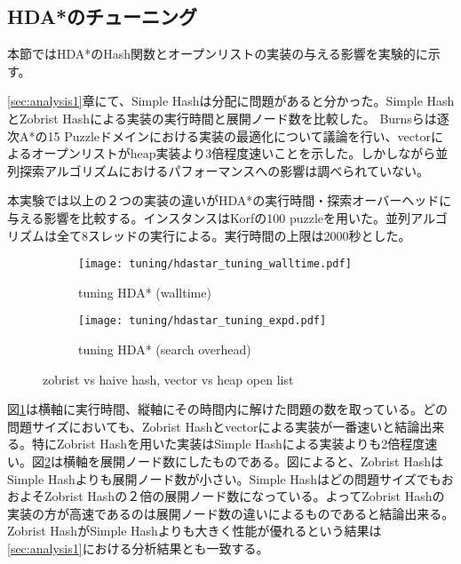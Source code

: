 \documentclass[uplatex]{jsarticle}
\begin{document}
\subsection{HDA*のチューニング}
\label{sec:hdastar_tuning}

本節ではHDA*のHash関数とオープンリストの実装の与える影響を実験的に示す。

\ref{sec:analysis1}章にて、Simple Hashは分配に問題があると分かった。Simple HashとZobrist Hashによる実装の実行時間と展開ノード数を比較した。
Burnsらは逐次A*の15 Puzzleドメインにおける実装の最適化について議論を行い、vectorによるオープンリストがheap実装より3倍程度速いことを示した\cite{Burns2012implementing}。しかしながら並列探索アルゴリズムにおけるパフォーマンスへの影響は調べられていない。

本実験では以上の２つの実装の違いがHDA*の実行時間・探索オーバーヘッドに与える影響を比較する。インスタンスはKorfの100 puzzleを用いた\cite{korf1985depth}。並列アルゴリズムは全て8スレッドの実行による。実行時間の上限は2000秒とした。
\newline

\begin{figure}[h]
	\centering
	\begin{subfigure}{0.4\columnwidth}
		\texttt{[image: tuning/hdastar\_tuning\_walltime.pdf]}
		\caption{tuning HDA* (walltime)}
		\label{fig:hdastar_tuning_walltime}
	\end{subfigure}
	\begin{subfigure}{0.4\columnwidth}
		\texttt{[image: tuning/hdastar\_tuning\_expd.pdf]}
		\caption{tuning HDA* (search overhead)}
		\label{fig:hdastar_tuning_expd}
	\end{subfigure}
	\caption{zobrist vs haive hash, vector vs heap open list}
	\label{fig:hdastar_tuning}
\end{figure}

図\ref{fig:hdastar_tuning_walltime}は横軸に実行時間、縦軸にその時間内に解けた問題の数を取っている。どの問題サイズにおいても、Zobrist Hashとvectorによる実装が一番速いと結論出来る。特にZobrist Hashを用いた実装はSimple Hashによる実装よりも2倍程度速い。図\ref{fig:hdastar_tuning_expd}は横軸を展開ノード数にしたものである。図によると、Zobrist HashはSimple Hashよりも展開ノード数が小さい。Simple Hashはどの問題サイズでもおおよそZobrist Hashの２倍の展開ノード数になっている。よってZobrist Hashの実装の方が高速であるのは展開ノード数の違いによるものであると結論出来る。Zobrist HashがSimple Hashよりも大きく性能が優れるという結果は\ref{sec:analysis1}における分析結果とも一致する。
\end{document}
